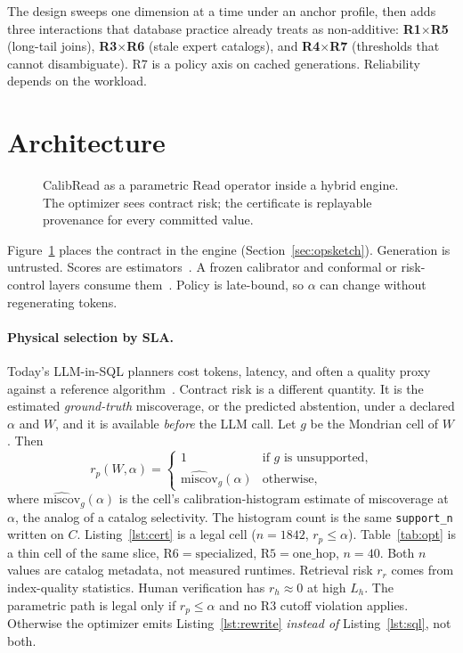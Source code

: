 \documentclass[sigconf, nonacm]{acmart}
\begin{document}
The design sweeps one dimension at a time under an anchor profile, then adds three interactions that database practice already treats as non-additive: \textbf{R1$\times$R5} (long-tail joins), \textbf{R3$\times$R6} (stale expert catalogs), and \textbf{R4$\times$R7} (thresholds that cannot disambiguate). R7 is a policy axis on cached generations. Reliability depends on the workload.

\section{Architecture}

\begin{figure}[t]
  \centering
  \CalibReadFigArchitecture
  \caption{CalibRead as a parametric Read operator inside a hybrid engine. The optimizer sees contract risk; the certificate is replayable provenance for every committed value.}
  \label{fig:arch}
\end{figure}

Figure~\ref{fig:arch} places the contract in the engine (Section~\ref{sec:opsketch}). Generation is untrusted. Scores are estimators~\cite{farquhar2024semantic,manakul2023selfcheckgpt}. A frozen calibrator and conformal or risk-control layers consume them~\cite{angelopoulos2024crc}. Policy is late-bound, so $\alpha$ can change without regenerating tokens.

\paragraph{Physical selection by SLA.}
Today's LLM-in-SQL planners cost tokens, latency, and often a quality proxy against a reference algorithm~\cite{russo2026abacus,an2025aidb,patel2025lotus}. Contract risk is a different quantity. It is the estimated \emph{ground-truth} miscoverage, or the predicted abstention, under a declared $\alpha$ and $W$, and it is available \emph{before} the LLM call. Let $g$ be the Mondrian cell of $W$. Then
\[
  r_p(W,\alpha)=\begin{cases}
    1 & \text{if $g$ is unsupported,}\\
    \widehat{\mathrm{miscov}}_g(\alpha) & \text{otherwise,}
  \end{cases}
\]
where $\widehat{\mathrm{miscov}}_g(\alpha)$ is the cell's calibration-histogram estimate of miscoverage at $\alpha$, the analog of a catalog selectivity. The histogram count is the same \texttt{support\_n} written on $C$. Listing~\ref{lst:cert} is a legal cell ($n{=}1842$, $r_p\le\alpha$). Table~\ref{tab:opt} is a thin cell of the same slice, $\mathrm{R6}=\mathrm{specialized}$, $\mathrm{R5}=\mathrm{one\_hop}$, $n{=}40$. Both $n$ values are catalog metadata, not measured runtimes. Retrieval risk $r_r$ comes from index-quality statistics. Human verification has $r_h\!\approx\!0$ at high $L_h$. The parametric path is legal only if $r_p\le\alpha$ and no R3 cutoff violation applies. Otherwise the optimizer emits Listing~\ref{lst:rewrite} \emph{instead of} Listing~\ref{lst:sql}, not both.
\end{document}
